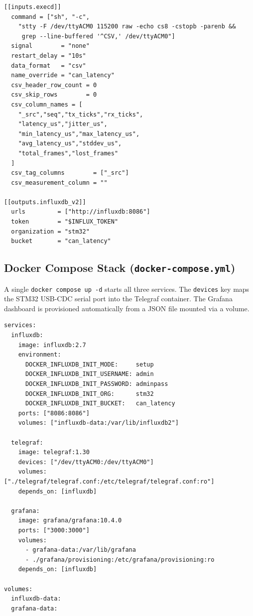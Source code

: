 \documentclass[11pt,a4paper]{article}
\begin{document}
\begin{lstlisting}[caption={telegraf.conf --- execd input plugin for STM32 serial port}]
[[inputs.execd]]
  command = ["sh", "-c",
    "stty -F /dev/ttyACM0 115200 raw -echo cs8 -cstopb -parenb &&
     grep --line-buffered '^CSV,' /dev/ttyACM0"]
  signal        = "none"
  restart_delay = "10s"
  data_format   = "csv"
  name_override = "can_latency"
  csv_header_row_count = 0
  csv_skip_rows        = 0
  csv_column_names = [
    "_src","seq","tx_ticks","rx_ticks",
    "latency_us","jitter_us",
    "min_latency_us","max_latency_us",
    "avg_latency_us","stddev_us",
    "total_frames","lost_frames"
  ]
  csv_tag_columns        = ["_src"]
  csv_measurement_column = ""

[[outputs.influxdb_v2]]
  urls         = ["http://influxdb:8086"]
  token        = "$INFLUX_TOKEN"
  organization = "stm32"
  bucket       = "can_latency"
\end{lstlisting}

\subsection{Docker Compose Stack (\texttt{docker-compose.yml})}

A single \texttt{docker compose up -d} starts all three services.  The \texttt{devices}
key maps the STM32 USB-CDC serial port into the Telegraf container.  The Grafana
dashboard is provisioned automatically from a JSON file mounted via a volume.

\begin{lstlisting}[caption={docker-compose.yml --- three-service monitoring stack}]
services:
  influxdb:
    image: influxdb:2.7
    environment:
      DOCKER_INFLUXDB_INIT_MODE:     setup
      DOCKER_INFLUXDB_INIT_USERNAME: admin
      DOCKER_INFLUXDB_INIT_PASSWORD: adminpass
      DOCKER_INFLUXDB_INIT_ORG:      stm32
      DOCKER_INFLUXDB_INIT_BUCKET:   can_latency
    ports: ["8086:8086"]
    volumes: ["influxdb-data:/var/lib/influxdb2"]

  telegraf:
    image: telegraf:1.30
    devices: ["/dev/ttyACM0:/dev/ttyACM0"]
    volumes: ["./telegraf/telegraf.conf:/etc/telegraf/telegraf.conf:ro"]
    depends_on: [influxdb]

  grafana:
    image: grafana/grafana:10.4.0
    ports: ["3000:3000"]
    volumes:
      - grafana-data:/var/lib/grafana
      - ./grafana/provisioning:/etc/grafana/provisioning:ro
    depends_on: [influxdb]

volumes:
  influxdb-data:
  grafana-data:
\end{lstlisting}
\end{document}
